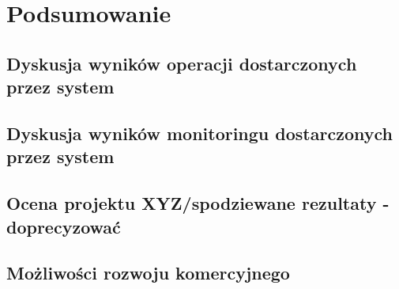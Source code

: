 \chapter{Podsumowanie} \label{chap.summary}

\section{Dyskusja wyników operacji dostarczonych przez system}
\section{Dyskusja wyników monitoringu dostarczonych przez system}
\section{Ocena projektu XYZ/spodziewane rezultaty - doprecyzować}
\section{Możliwości rozwoju komercyjnego}
